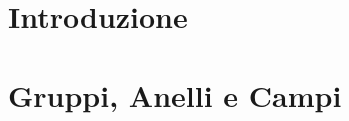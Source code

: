 



\section{Introduzione}

\textsf{\small }


\newpage


\section{Gruppi, Anelli e Campi} %

\textsf{\small }



